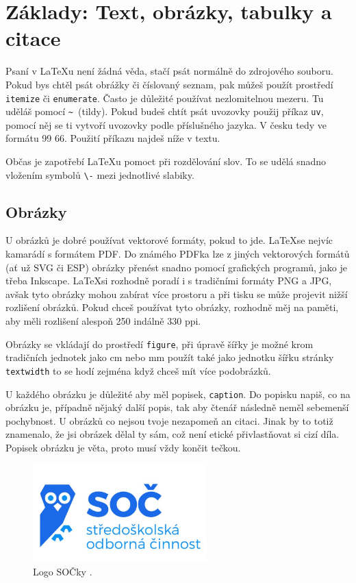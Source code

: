 \documentclass[12pt, a4paper,
 twoside,        %
 openright
]{report}
\begin{document}
\section[Základy]{Základy: Text, obrázky, tabulky a citace} %
Psaní v \LaTeX{u} není žádná věda, stačí psát normálně do zdrojového souboru. Pokud bys chtěl psát obrážky či číslovaný seznam, pak můžeš použít prostředí \texttt{itemize} či \texttt{enumerate}. Často je důležité používat nezlomitelnou mezeru. Tu uděláš pomocí \verb|~|~(tildy). Pokud budeš chtít psát uvozovky použij příkaz \texttt{uv}, pomocí něj se ti vytvoří uvozovky podle příslušného jazyka. V česku tedy ve formátu 99 66. Použití příkazu najdeš níže v textu.

Občas je zapotřebí \LaTeX{u} pomoct při rozdělování slov. To se udělá snadno vložením symbolů \verb|\-| mezi jednotlivé slabiky.

\subsection{Obrázky}

U obrázků je dobré používat vektorové formáty, pokud to jde. \LaTeX se nejvíc kamarádí s formátem PDF. Do známého PDFka lze z jiných vektorových formátů (ať už SVG či ESP) obrázky přenést snadno pomocí grafických programů, jako je třeba Inkscape. \LaTeX si rozhodně poradí i s tradičními formáty PNG a JPG, avšak tyto obrázky mohou zabírat více prostoru a při tisku se může projevit nižší rozlišení obrázků. Pokud chceš používat tyto obrázky, rozhodně měj na paměti, aby měli rozlišení alespoň 250 indálně 330 ppi.

Obrázky se vkládají do prostředí \texttt{figure}, při úpravě šířky je možné krom tradičních jednotek jako cm nebo mm použít také jako jednotku šířku stránky \texttt{textwidth} to se hodí zejména když chceš mít více podobrázků. 

U každého obrázku je důležité aby měl popisek, \texttt{caption}. Do popisku napiš, co na obrázku je, případně nějaký další popis, tak aby čtenář následně neměl sebemenší pochybnost. U obrázků co nejsou tvoje nezapomeň an citaci. Jinak by to totiž znamenalo, že jsi obrázek dělal ty sám, což není etické přivlastňovat si cizí díla. Popisek obrázku je věta, proto musí vždy končit tečkou.

\begin{figure}
    \centering %
    \includegraphics[width=0.6\textwidth]{imgs/soc-logo.jpg} %
    \caption{Logo SOČky \cite{socLogo}.} %
    \label{fig:logoSOC} %
\end{figure}
\end{document}
